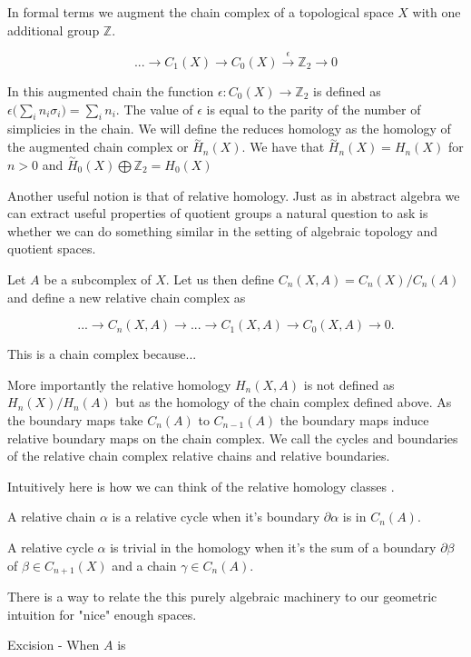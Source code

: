 In formal terms we augment the chain complex of a topological space $X$ with one additional group $\mathbb{Z}$.

$$ ... \longrightarrow C_1(X) \longrightarrow C_0(X) \overset{\epsilon}{\longrightarrow} \mathbb{Z}_2 \longrightarrow 0 $$

In this augmented chain the function $\epsilon: C_0(X) \to \mathbb{Z}_2$ is defined as $\epsilon\big(\sum_{i}n_i\sigma_i\big) = \sum_{i}n_i$. The value of $\epsilon$ is equal to the parity of the number of simplicies in the chain. We will define the reduces homology as the homology of the augmented chain complex or $\overset{\sim}{H}_n(X)$. We have that $\overset{\sim}{H}_n(X) = H_n(X)$ for $n > 0$ and $\overset{\sim}{H}_0(X) \bigoplus \mathbb{Z}_2 = H_0(X) $

Another useful notion is that of relative homology. Just as in abstract algebra we can extract useful properties of quotient groups a natural question to ask is whether we can do something similar in the setting of algebraic topology and quotient spaces. 

Let $A$ be a subcomplex of $X$. Let us then define $C_n(X, A) = C_n(X) / C_n(A)$ and define a new relative chain complex as

$$ ... \longrightarrow C_n(X, A) \longrightarrow ... \longrightarrow C_1(X, A) \longrightarrow C_0(X, A) \longrightarrow 0. $$

This is a chain complex because...

More importantly the relative homology $H_n(X, A)$ is not defined as $H_n(X) / H_n(A)$ but as the homology of the chain complex defined above. As the boundary maps take $C_n(A)$ to $C_{n-1}(A)$ the boundary maps induce relative boundary maps on the chain complex. We call the cycles and boundaries of the relative chain complex relative chains and relative boundaries.

Intuitively here is how we can think of the relative homology classes \cite{algebraic-topology}.

A relative chain $\alpha$ is a relative cycle when it's boundary $\partial\alpha $ is in $C_n(A)$.

A relative cycle $\alpha$ is trivial in the homology when it's the sum of a boundary $\partial \beta$ of $\beta \in C_{n+1}(X)$ and a chain $\gamma \in C_n(A)$.

There is a way to relate the this purely algebraic machinery to our geometric intuition for "nice" enough spaces.


\begin{thm} Excision - When $A$ is  \end{thm}


